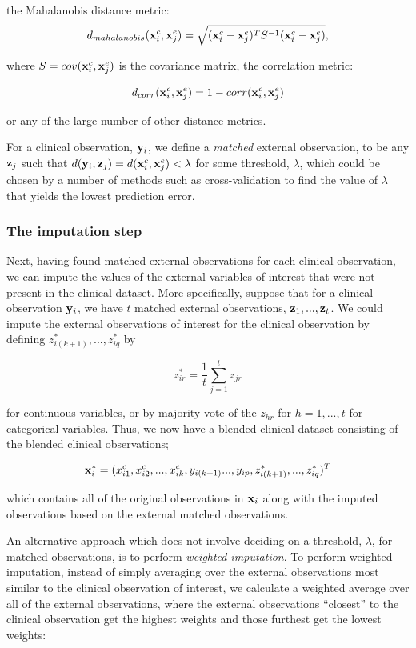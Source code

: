 \documentclass{article}
\begin{document}
the Mahalanobis distance metric:
$$d_{mahalanobis}({\bf x}_i^c, {\bf x}_j^e) = \sqrt{({\bf x}_i^c - {\bf x}_j^e)^T S^{-1}({\bf x}_i^c - {\bf x}_j^e)},$$

where $S = cov({\bf x}_i^c, {\bf x}_j^e)$ is the covariance matrix, the correlation metric:

$$d_{corr}({\bf x}_i^c, {\bf x}_j^e) = 1 - corr({\bf x}_i^c, {\bf x}_j^e)$$

or any of the large number of other distance metrics.


For a clinical observation, ${\bf y}_i$, we define a \emph{matched} external observation, to be any ${\bf z}_j$ such that $d({\bf y}_i, {\bf z}_j) = d({\bf x}^c_i, {\bf x}^e_j) < \lambda$ for some threshold, $\lambda$, which could be chosen by a number of methods such as cross-validation to find the value of $\lambda$ that yields the lowest prediction error. 

\subsubsection{The imputation step}


Next, having found matched external observations for each clinical observation, we can impute the values of the external variables of interest that were not present in the clinical dataset. More specifically, suppose that for a clinical observation ${\bf y}_i$, we have $t$ matched external observations, ${\bf z}_1, ..., {\bf z}_t$. We could impute the external observations of interest for the clinical observation by  defining $z^*_{i(k+1)}, ..., z^*_{iq}$ by

$$z^*_{ir} = \frac{1}{t} \sum_{j=1}^t z_{jr}$$

for continuous variables, or by majority vote of the $z_{hr}$ for $h = 1, ..., t$ for categorical variables. Thus, we now have a blended clinical dataset consisting of the blended clinical observations;

$${\bf x}^*_i = (x^c_{i1}, x^c_{i2}, ..., x^c_{ik}, y_{i(k+1)} ..., y_{ip}, z_{i(k+1)}^*, ..., z_{iq}^*)^T$$

which contains all of the original observations in ${\bf x}_i$ along with the imputed observations based on the external matched observations.

An alternative approach which does not involve deciding on a threshold, $\lambda$, for matched observations, is to perform \emph{weighted imputation}. To perform weighted imputation, instead of simply averaging over the external observations most similar to the clinical observation of interest, we calculate a weighted average over all of the external observations, where the external observations ``closest'' to the clinical observation get the highest weights and those furthest get the lowest weights:
\end{document}
